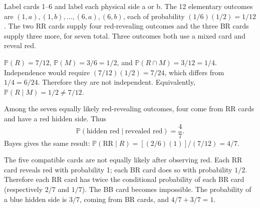 \documentclass[11pt]{article}
\begin{document}
\begin{parts}
\item Label cards 1--6 and label each physical side a or b. The 12 elementary outcomes are $(1,a),(1,b),\ldots,(6,a),(6,b)$, each of probability $(1/6)(1/2)=1/12$. The two RR cards supply four red-revealing outcomes and the three BR cards supply three more, for seven total. Three outcomes both use a mixed card and reveal red.
\item $\mathbb P(R)=7/12$, $\mathbb P(M)=3/6=1/2$, and $\mathbb P(R\cap M)=3/12=1/4$. Independence would require $(7/12)(1/2)=7/24$, which differs from $1/4=6/24$. Therefore they are not independent. Equivalently, $\mathbb P(R\mid M)=1/2\ne7/12$.
\item Among the seven equally likely red-revealing outcomes, four come from RR cards and have a red hidden side. Thus
\[
\mathbb P(\text{hidden red}\mid\text{revealed red})=\frac47.
\]
Bayes gives the same result: $\mathbb P(\mathrm{RR}\mid R)=[(2/6)(1)]/(7/12)=4/7$.
\item The five compatible cards are not equally likely after observing red. Each RR card reveals red with probability 1; each BR card does so with probability $1/2$. Therefore each RR card has twice the conditional probability of each BR card (respectively $2/7$ and $1/7$). The BB card becomes impossible. The probability of a blue hidden side is $3/7$, coming from BR cards, and $4/7+3/7=1$.
\end{parts}
\end{document}
